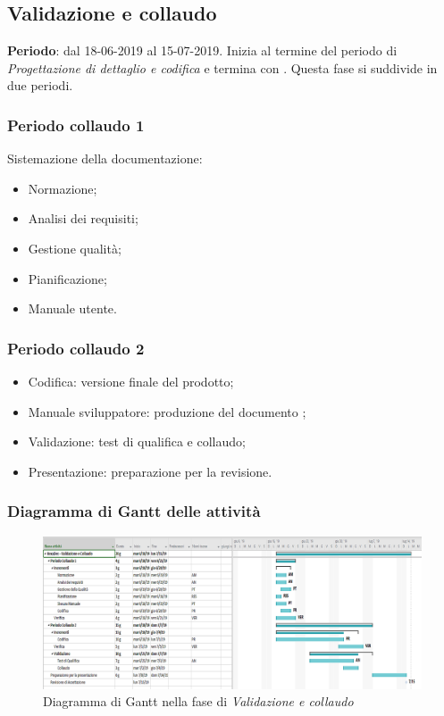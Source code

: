     \subsection{Validazione e collaudo}
    \textbf{Periodo}: dal 18-06-2019 al 15-07-2019.  \newline
    Inizia al termine del periodo di \textit{Progettazione di dettaglio e codifica} e termina con \RA.
    Questa fase si suddivide in due periodi.
        \subsubsection{Periodo collaudo 1}
            Sistemazione della documentazione:
            \begin{itemize}
                \item Normazione;
                \item Analisi dei requisiti;
                \item Gestione qualità;
                \item Pianificazione;
                \item Manuale utente.
            \end{itemize}
        
        \subsubsection{Periodo collaudo 2}
            \begin{itemize}
                \item Codifica: versione finale del prodotto;
                \item Manuale sviluppatore: produzione del documento \docNameMS;
                \item Validazione: test di qualifica e collaudo;
                \item Presentazione: preparazione per la revisione. 
            \end{itemize}
            
        \subsubsection{Diagramma di Gantt delle attività}
            \begin{figure}[H]
                \centering
                \includegraphics[width=\textwidth,height=\textheight,keepaspectratio]{immagini/gantt/GantRA.png}
                \caption{Diagramma di Gantt nella fase di \textit{Validazione e collaudo}}
            \end{figure}